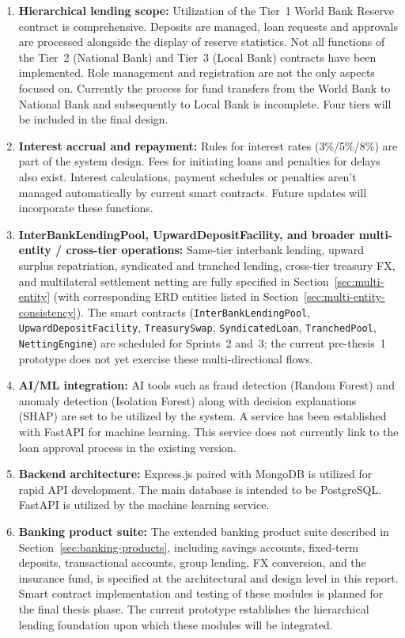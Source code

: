 \documentclass[12pt,a4paper]{report}
\begin{document}
\begin{enumerate}[noitemsep]
\item \textbf{Hierarchical lending scope:} Utilization of the Tier~1 World Bank Reserve contract is comprehensive. Deposits are managed, loan requests and approvals are processed alongside the display of reserve statistics. Not all functions of the Tier~2 (National Bank) and Tier~3 (Local Bank) contracts have been implemented. Role management and registration are not the only aspects focused on. Currently the process for fund transfers from the World Bank to National Bank and subsequently to Local Bank is incomplete. Four tiers will be included in the final design.

\item \textbf{Interest accrual and repayment:} Rules for interest rates (3\%/5\%/8\%) are part of the system design. Fees for initiating loans and penalties for delays also exist. Interest calculations, payment schedules or penalties aren't managed automatically by current smart contracts. Future updates will incorporate these functions.

\item \textbf{InterBankLendingPool, UpwardDepositFacility, and broader multi-entity / cross-tier operations:} Same-tier interbank lending, upward surplus repatriation, syndicated and tranched lending, cross-tier treasury FX, and multilateral settlement netting are fully specified in Section~\ref{sec:multi-entity} (with corresponding ERD entities listed in Section~\ref{sec:multi-entity-consistency}). The smart contracts (\texttt{InterBankLendingPool}, \texttt{UpwardDepositFacility}, \texttt{TreasurySwap}, \texttt{SyndicatedLoan}, \texttt{TranchedPool}, \texttt{NettingEngine}) are scheduled for Sprints~2 and~3; the current pre-thesis~1 prototype does not yet exercise these multi-directional flows.

\item \textbf{AI/ML integration:} AI tools such as fraud detection (Random Forest) and anomaly detection (Isolation Forest) along with decision explanations (SHAP) are set to be utilized by the system. A service has been established with FastAPI for machine learning. This service does not currently link to the loan approval process in the existing version.

\item \textbf{Backend architecture:} Express.js paired with MongoDB is utilized for rapid API development. The main database is intended to be PostgreSQL. FastAPI is utilized by the machine learning service.

\item \textbf{Banking product suite:} The extended banking product suite described in Section~\ref{sec:banking-products}, including savings accounts, fixed-term deposits, transactional accounts, group lending, FX conversion, and the insurance fund, is specified at the architectural and design level in this report. Smart contract implementation and testing of these modules is planned for the final thesis phase. The current prototype establishes the hierarchical lending foundation upon which these modules will be integrated.
\end{enumerate}
\end{document}
